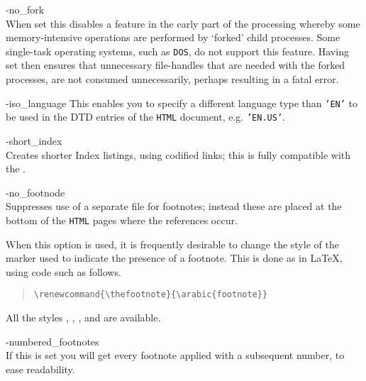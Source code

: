 \begin{htmllist}
%

%
\item [ -no\_fork\label{cs_no_fork}]
\\
When set this disables a feature in the early part of the processing
whereby some memory-intensive operations are performed by `forked'
child processes. Some single-task operating systems, such as \texttt{DOS},
do not support this feature. Having  set then ensures
that unnecessary file-handles that are needed with the forked processes,
are not consumed unnecessarily, perhaps resulting in a fatal \Perl{} error.

\item [ -iso\_language \Meta{type}\label{cs_iso_language}]
This enables you to specify a different language type than
\texttt{'EN'} to be used in the DTD entries of the \texttt{HTML}
document, e.g. \texttt{'EN.US'}.

\item [ -short\_index\label{cs_shortindex}]
\\
Creates shorter Index listings, using codified links; 
this is fully compatible with the  .

%
%

\item [ -no\_footnode\label{cs_nofootnode}]
\\
Suppresses use of a separate file for footnotes;
instead these are placed at the bottom of the \texttt{HTML} pages 
where the references occur.

When this option is used, it is frequently desirable to change the 
style of the marker used to indicate the presence of a footnote. 
This is done as in \LaTeX, using code such as follows.
\begin{quote}
\verb|\renewcommand{\thefootnote}{\arabic{footnote}}|
\end{quote}
All the styles , , ,  and 
are available.

\item [ -numbered\_footnotes\label{cs_numbered_footnotes}]
\\
If this is set you will get every footnote applied with a subsequent
number, to ease readability.


\end{htmllist}
